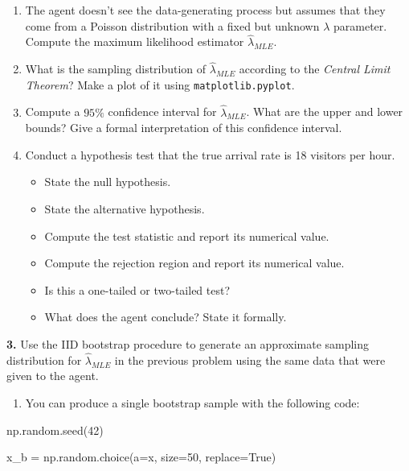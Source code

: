 \documentclass[
  letterpaper,
  DIV=11,
  numbers=noendperiod]{scrartcl}
\newenvironment{Shaded}{\begin{snugshade}}{\end{snugshade}}
\newcommand{\DecValTok}[1]{\textcolor[rgb]{0.68,0.00,0.00}{#1}}
\newcommand{\NormalTok}[1]{\textcolor[rgb]{0.00,0.23,0.31}{#1}}
\newcommand{\OperatorTok}[1]{\textcolor[rgb]{0.37,0.37,0.37}{#1}}
\newcommand{\VariableTok}[1]{\textcolor[rgb]{0.07,0.07,0.07}{#1}}
\providecommand{\tightlist}{%
  \setlength{\itemsep}{0pt}\setlength{\parskip}{0pt}}\usepackage{longtable,booktabs,array}
\begin{document}
\begin{enumerate}
\def\labelenumi{\alph{enumi}.}
\setcounter{enumi}{1}
\item
  The agent doesn't see the data-generating process but assumes that
  they come from a Poisson distribution with a fixed but unknown
  \(\lambda\) parameter. Compute the maximum likelihood estimator
  \(\hat{\lambda}_{MLE}\).
\item
  What is the sampling distribution of \(\hat{\lambda}_{MLE}\) according
  to the \emph{Central Limit Theorem}? Make a plot of it using
  \texttt{matplotlib.pyplot}.
\item
  Compute a \(95\%\) confidence interval for \(\hat{\lambda}_{MLE}\).
  What are the upper and lower bounds? Give a formal interpretation of
  this confidence interval.
\item
  Conduct a hypothesis test that the true arrival rate is 18 visitors
  per hour.

  \begin{itemize}
  \tightlist
  \item
    State the null hypothesis.
  \item
    State the alternative hypothesis.
  \item
    Compute the test statistic and report its numerical value.
  \item
    Compute the rejection region and report its numerical value.
  \item
    Is this a one-tailed or two-tailed test?
  \item
    What does the agent conclude? State it formally.
  \end{itemize}
\end{enumerate}

\textbf{3.} Use the IID bootstrap procedure to generate an approximate
sampling distribution for \(\hat{\lambda}_{MLE}\) in the previous
problem using the same data that were given to the agent.

\begin{enumerate}
\def\labelenumi{\alph{enumi}.}
\tightlist
\item
  You can produce a single bootstrap sample with the following code:
\end{enumerate}

\begin{Shaded}
\begin{Highlighting}[]
\NormalTok{np.random.seed(}\DecValTok{42}\NormalTok{)}

\NormalTok{x\_b }\OperatorTok{=}\NormalTok{ np.random.choice(a}\OperatorTok{=}\NormalTok{x, size}\OperatorTok{=}\DecValTok{50}\NormalTok{, replace}\OperatorTok{=}\VariableTok{True}\NormalTok{)}
\end{Highlighting}
\end{Shaded}
\end{document}
